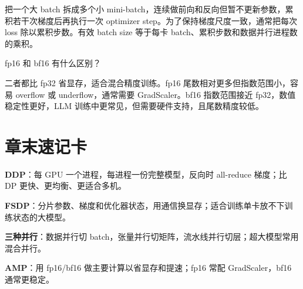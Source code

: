 \begin{answer}
把一个大 batch 拆成多个小 mini-batch，连续做前向和反向但暂不更新参数，累积若干次梯度后再执行一次 optimizer step。为了保持梯度尺度一致，通常把每次 loss 除以累积步数。有效 batch size 等于每卡 batch、累积步数和数据并行进程数的乘积。
\end{answer}
\begin{interview}
fp16 和 bf16 有什么区别？
\end{interview}
\begin{answer}
二者都比 fp32 省显存，适合混合精度训练。fp16 尾数相对更多但指数范围小，容易 overflow 或 underflow，通常需要 GradScaler。bf16 指数范围接近 fp32，数值稳定性更好，LLM 训练中更常见，但需要硬件支持，且尾数精度较低。
\end{answer}
\section{章末速记卡}
\begin{quickcard}
\textbf{DDP}：每 GPU 一个进程，每进程一份完整模型，反向时 all-reduce 梯度；比 DP 更快、更均衡、更适合多机。
\end{quickcard}
\begin{quickcard}
\textbf{FSDP}：分片参数、梯度和优化器状态，用通信换显存；适合训练单卡放不下训练状态的大模型。
\end{quickcard}
\begin{quickcard}
\textbf{三种并行}：数据并行切 batch，张量并行切矩阵，流水线并行切层；超大模型常用混合并行。
\end{quickcard}
\begin{quickcard}
\textbf{AMP}：用 fp16/bf16 做主要计算以省显存和提速；fp16 常配 GradScaler，bf16 通常更稳定。
\end{quickcard}
